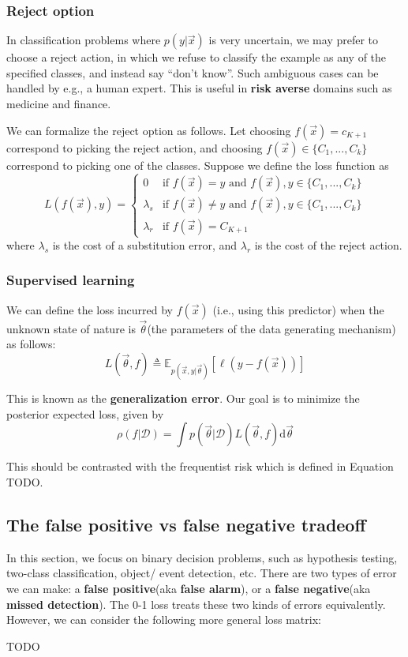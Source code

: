 \subsubsection{Reject option}
In classification problems where $p(y|\vec{x})$ is very uncertain, we may prefer to choose a reject action, in which we refuse to classify the example as any of the specified classes, and instead say “don’t know”. Such ambiguous cases can be handled by e.g., a human expert. This is useful in \textbf{risk averse} domains such as medicine and finance.

We can formalize the reject option as follows. Let choosing $f(\vec{x})=c_{K+1}$ correspond to picking the reject action, and choosing $f(\vec{x}) \in \{C_1,...,C_k\}$ correspond to picking one of the classes. Suppose we define the loss function as
\begin{equation}
L(f(\vec{x}), y)=\begin{cases} 
0 & \text{if } f(\vec{x})=y \text{ and } f(\vec{x}),y \in \{C_1,...,C_k\} \\
\lambda_s & \text{if } f(\vec{x}) \neq y \text{ and } f(\vec{x}),y \in \{C_1,...,C_k\} \\
\lambda_r & \text{if } f(\vec{x})=C_{K+1}
\end{cases}
\end{equation}
where $\lambda_s$ is the cost of a substitution error, and $\lambda_r$ is the cost of the reject action. 


\subsubsection{Supervised learning}
We can define the loss incurred by $f(\vec{x})$ (i.e., using this predictor) when the unknown state of nature is $\vec{\theta}$(the parameters of the data generating mechanism) as follows:
\begin{equation}
L(\vec{\theta},f) \triangleq \mathbb{E}_{p(\vec{x},y|\vec{\theta})}[\ell(y-f(\vec{x}))]
\end{equation}

This is known as the \textbf{generalization error}. Our goal is to minimize the posterior expected loss, given by
\begin{equation}
\rho(f|\mathcal{D}) = \int{p(\vec{\theta}|\mathcal{D})L(\vec{\theta},f)}\mathrm{d}\vec{\theta}
\end{equation}

This should be contrasted with the frequentist risk which is defined in Equation TODO.


\subsection{The false positive vs false negative tradeoff}
In this section, we focus on binary decision problems, such as hypothesis testing, two-class classification, object/ event detection, etc. There are two types of error we can make: a \textbf{false positive}(aka \textbf{false alarm}), or a \textbf{false negative}(aka \textbf{missed detection}). The 0-1 loss treats these two kinds of errors equivalently. However, we can consider the following more general loss matrix:

TODO

